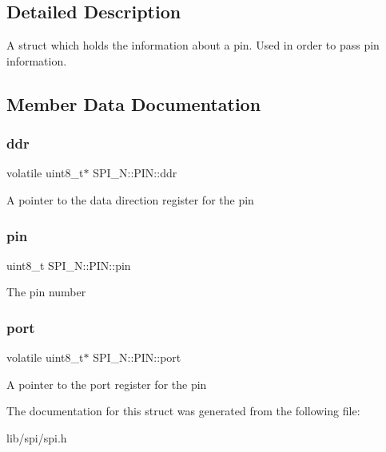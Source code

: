 \subsection{Detailed Description}
A struct which holds the information about a pin. Used in order to pass pin information. 

\subsection{Member Data Documentation}
\hypertarget{struct_s_p_i___n_1_1_p_i_n_a6ccc89a50bb2562bacdd839edd2442c5}{}\label{struct_s_p_i___n_1_1_p_i_n_a6ccc89a50bb2562bacdd839edd2442c5} 
\subsubsection{\texorpdfstring{ddr}{ddr}}
{\footnotesize\ttfamily volatile uint8\+\_\+t$\ast$ S\+P\+I\+\_\+\+N\+::\+P\+I\+N\+::ddr}

A pointer to the data direction register for the pin \hypertarget{struct_s_p_i___n_1_1_p_i_n_abb2cb9d43e5af9fe7d59df75aca39b0b}{}\label{struct_s_p_i___n_1_1_p_i_n_abb2cb9d43e5af9fe7d59df75aca39b0b} 
\subsubsection{\texorpdfstring{pin}{pin}}
{\footnotesize\ttfamily uint8\+\_\+t S\+P\+I\+\_\+\+N\+::\+P\+I\+N\+::pin}

The pin number \hypertarget{struct_s_p_i___n_1_1_p_i_n_ae1d5f750e364d99dfa888bf2042fa6c2}{}\label{struct_s_p_i___n_1_1_p_i_n_ae1d5f750e364d99dfa888bf2042fa6c2} 
\subsubsection{\texorpdfstring{port}{port}}
{\footnotesize\ttfamily volatile uint8\+\_\+t$\ast$ S\+P\+I\+\_\+\+N\+::\+P\+I\+N\+::port}

A pointer to the port register for the pin 

The documentation for this struct was generated from the following file\+:\begin{DoxyCompactItemize}
\item 
lib/spi/spi.\+h\end{DoxyCompactItemize}
